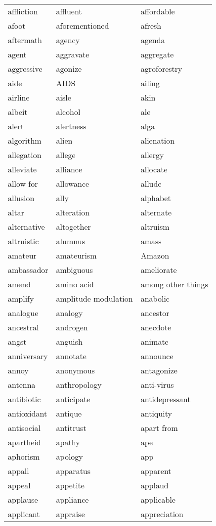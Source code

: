 \documentclass{minimal}
\begin{document}
\begin{longtable}{p{2.7cm}@{\hskip 0.2cm}p{2.7cm}@{\hskip 0.2cm}p{2.7cm}}
affliction & affluent & affordable \\
afoot & aforementioned & afresh \\
aftermath & agency & agenda \\
agent & aggravate & aggregate \\
aggressive & agonize & agroforestry \\
aide & AIDS & ailing \\
airline & aisle & akin \\
albeit & alcohol & ale \\
alert & alertness & alga \\
algorithm & alien & alienation \\
allegation & allege & allergy \\
alleviate & alliance & allocate \\
allow for & allowance & allude \\
allusion & ally & alphabet \\
altar & alteration & alternate \\
alternative & altogether & altruism \\
altruistic & alumnus & amass \\
amateur & amateurism & Amazon \\
ambassador & ambiguous & ameliorate \\
amend & amino acid & among other things \\
amplify & amplitude modulation & anabolic \\
analogue & analogy & ancestor \\
ancestral & androgen & anecdote \\
angst & anguish & animate \\
anniversary & annotate & announce \\
annoy & anonymous & antagonize \\
antenna & anthropology & anti-virus \\
antibiotic & anticipate & antidepressant \\
antioxidant & antique & antiquity \\
antisocial & antitrust & apart from \\
apartheid & apathy & ape \\
aphorism & apology & app \\
appall & apparatus & apparent \\
appeal & appetite & applaud \\
applause & appliance & applicable \\
applicant & appraise & appreciation \\

\end{longtable}
\end{document}
